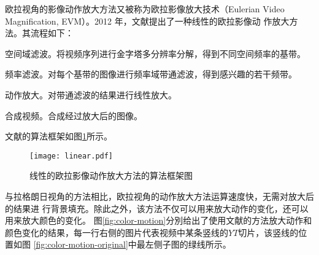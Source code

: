 欧拉视角的影像动作放大方法又被称为欧拉影像放大技术（Eulerian Video
Magnification, EVM）。2012 年，文献\cite{wu2012eulerian}提出了一种线性的欧拉影像动
作放大方法。其流程如下：

\begin{compactenum}
\item 空间域滤波。将视频序列进行金字塔多分辨率分解，得到不同空间频率的基带。
\item 频率滤波。对每个基带的图像进行频率域带通滤波，得到感兴趣的若干频带。
\item 动作放大。对带通滤波的结果进行线性放大。
\item 合成视频。合成经过放大后的图像。
\end{compactenum}

文献\cite{wu2012eulerian}的算法框架如图\ref{fig:linear}所示。

\begin{figure}[htbp]
  \centering
  \texttt{[image: linear.pdf]}
  \caption{线性的欧拉影像动作放大方法的算法框架图}
  \label{fig:linear}
\end{figure}

与拉格朗日视角的方法相比，欧拉视角的动作放大方法运算速度快，无需对放大后的结果进
行背景填充。除此之外，该方法不仅可以用来放大动作的变化，还可以用来放大颜色的变化。
图\ref{fig:color-motion}分別给出了使用文献\cite{wu2012eulerian}的方法放大动作和
颜色变化的结果，每一行右侧的图片代表视频中某条竖线的$YT$切片，该竖线的位置如图
\ref{fig:color-motion-original}中最左侧子图的绿线所示。

      


